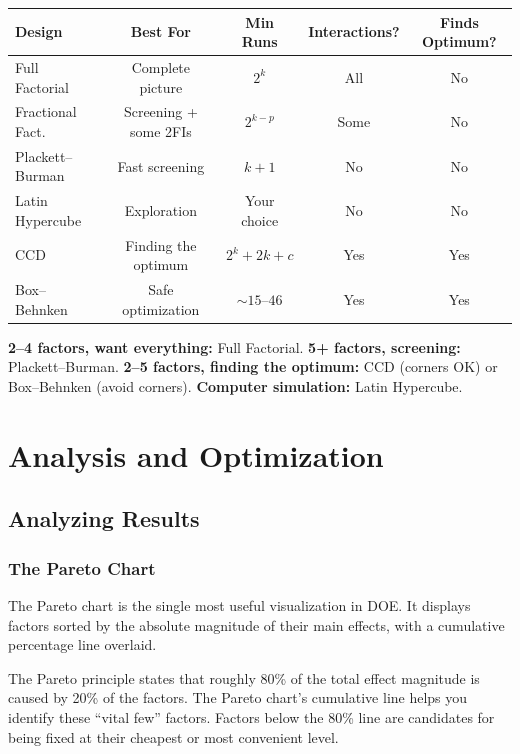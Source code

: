 \documentclass[11pt]{book}
\begin{document}
\begin{center}
\begin{tabular}{lcccc}
\toprule
Design & Best For & Min Runs & Interactions? & Finds Optimum? \\
\midrule
Full Factorial & Complete picture & $2^k$ & All & No \\
Fractional Fact. & Screening + some 2FIs & $2^{k-p}$ & Some & No \\
Plackett--Burman & Fast screening & $k{+}1$ & No & No \\
Latin Hypercube & Exploration & Your choice & No & No \\
CCD & Finding the optimum & $2^k{+}2k{+}c$ & Yes & Yes \\
Box--Behnken & Safe optimization & $\sim 15$--$46$ & Yes & Yes \\
\bottomrule
\end{tabular}
\end{center}

\begin{keypoint}
\textbf{2--4 factors, want everything:} Full Factorial.
\textbf{5+ factors, screening:} Plackett--Burman.
\textbf{2--5 factors, finding the optimum:} CCD (corners OK) or Box--Behnken
(avoid corners). \textbf{Computer simulation:} Latin Hypercube.
\end{keypoint}


\part{Analysis and Optimization}

\chapter{Analyzing Results}

\section{The Pareto Chart}

The Pareto chart is the single most useful visualization in DOE. It displays
factors sorted by the absolute magnitude of their main effects, with a
cumulative percentage line overlaid.

\begin{keypoint}
The Pareto principle states that roughly 80\% of the total effect magnitude is
caused by 20\% of the factors. The Pareto chart's cumulative line helps you
identify these ``vital few'' factors. Factors below the 80\% line are
candidates for being fixed at their cheapest or most convenient level.
\end{keypoint}
\end{document}
